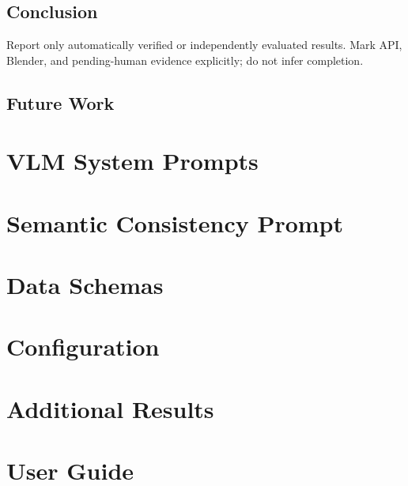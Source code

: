 \documentclass[11pt,oneside]{report}
\begin{document}
\section{Conclusion}
\noindent Report only automatically verified or independently evaluated results.
Mark API, Blender, and pending-human evidence explicitly; do not infer completion.
\section{Future Work}




\appendix
\chapter{VLM System Prompts}
\chapter{Semantic Consistency Prompt}
\chapter{Data Schemas}
\chapter{Configuration}
\chapter{Additional Results}
\chapter{User Guide}
\end{document}
